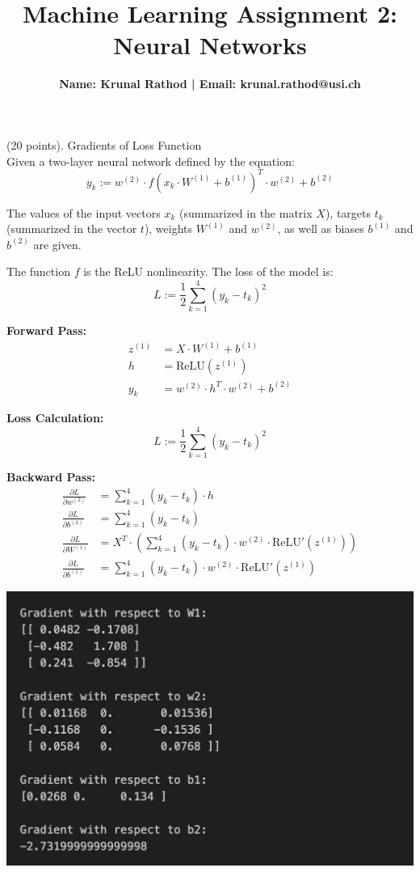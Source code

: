 \documentclass[11pt]{article}
\title{Machine Learning Assignment 2: Neural Networks}
\author{\textbf{Name: Krunal Rathod | Email: krunal.rathod@usi.ch}}
\date{}
\begin{document}
\maketitle 

\begin{list}{{\bf Question }}
{
\setlength{\listparindent}{0mm}
\setlength{\leftmargin}{0mm}}


\item (20 points). Gradients of Loss Function \\

Given a two-layer neural network defined by the equation:
\[ y_k := w^{(2)} \cdot f(x_k \cdot W^{(1)} + b^{(1)})^T \cdot w^{(2)} + b^{(2)} \]

The values of the input vectors \(x_k\) (summarized in the matrix \(X\)), targets \(t_k\) (summarized in the vector \(t\)), weights \(W^{(1)}\) and \(w^{(2)}\), as well as biases \(b^{(1)}\) and \(b^{(2)}\) are given.

The function \(f\) is the ReLU nonlinearity. The loss of the model is:
\[ L := \frac{1}{2} \sum_{k=1}^{4} (y_k - t_k)^2 \]

\textbf{Forward Pass:}
\begin{align*}
    z^{(1)} &= X \cdot W^{(1)} + b^{(1)} \\
    h &= \text{ReLU}(z^{(1)}) \\
    y_k &= w^{(2)} \cdot h^T \cdot w^{(2)} + b^{(2)}
\end{align*}

\textbf{Loss Calculation:}
\[ L := \frac{1}{2} \sum_{k=1}^{4} (y_k - t_k)^2 \]

\textbf{Backward Pass:}
\begin{align*}
    \frac{\partial L}{\partial w^{(2)}} &= \sum_{k=1}^{4} (y_k - t_k) \cdot h \\
    \frac{\partial L}{\partial b^{(2)}} &= \sum_{k=1}^{4} (y_k - t_k) \\
    \frac{\partial L}{\partial W^{(1)}} &= X^T \cdot \left( \sum_{k=1}^{4} (y_k - t_k) \cdot w^{(2)} \cdot \text{ReLU}'(z^{(1)}) \right) \\
    \frac{\partial L}{\partial b^{(1)}} &= \sum_{k=1}^{4} (y_k - t_k) \cdot w^{(2)} \cdot \text{ReLU}'(z^{(1)})
\end{align*}

\includegraphics[width=16cm]{gradients.png}



\end{list}
\end{document}
